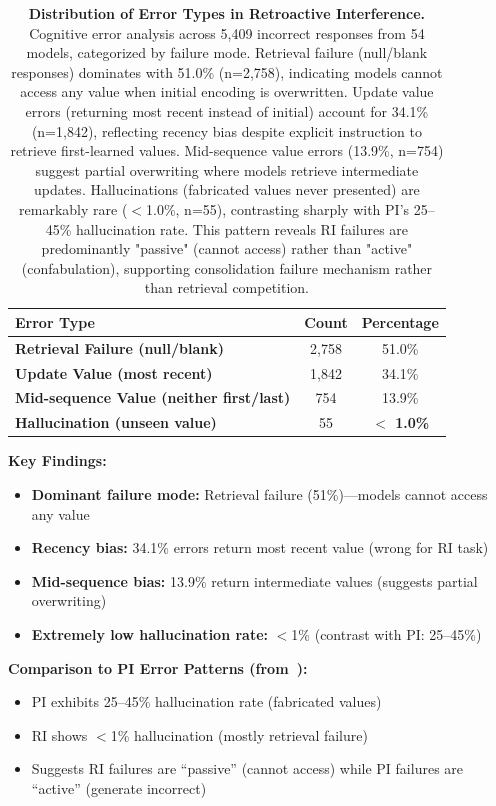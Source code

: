 \documentclass{article}
\begin{document}
\begin{table}[t]
\centering
\caption{\textbf{Distribution of Error Types in Retroactive Interference.}
Cognitive error analysis across 5,409 incorrect responses from 54 models, categorized by failure mode.
Retrieval failure (null/blank responses) dominates with 51.0\% (n=2,758), indicating models cannot access any value when initial encoding is overwritten.
Update value errors (returning most recent instead of initial) account for 34.1\% (n=1,842), reflecting recency bias despite explicit instruction to retrieve first-learned values.
Mid-sequence value errors (13.9\%, n=754) suggest partial overwriting where models retrieve intermediate updates.
Hallucinations (fabricated values never presented) are remarkably rare ($<$1.0\%, n=55), contrasting sharply with PI's 25--45\% hallucination rate.
This pattern reveals RI failures are predominantly "passive" (cannot access) rather than "active" (confabulation), supporting consolidation failure mechanism rather than retrieval competition.}
\begin{tabular}{lcc}
\toprule
Error Type & Count & Percentage \\
\midrule
\textbf{Retrieval Failure (null/blank)} & 2,758 & 51.0\% \\
\textbf{Update Value (most recent)} & 1,842 & 34.1\% \\
\textbf{Mid-sequence Value (neither first/last)} & 754 & 13.9\% \\
\textbf{Hallucination (unseen value)} & 55 & \textbf{$<$ 1.0\%} \\
\bottomrule
\end{tabular}
\end{table}

\textbf{Key Findings:}
\begin{itemize}[itemsep=2pt,topsep=3pt,parsep=0pt]
    \item \textbf{Dominant failure mode:} Retrieval failure (51\%)---models cannot access any value
    \item \textbf{Recency bias:} 34.1\% errors return most recent value (wrong for RI task)
    \item \textbf{Mid-sequence bias:} 13.9\% return intermediate values (suggests partial overwriting)
    \item \textbf{Extremely low hallucination rate:} $<$1\% (contrast with PI: 25--45\%)
\end{itemize}

\textbf{Comparison to PI Error Patterns (from~\citet{liu2024unable}):}
\begin{itemize}[itemsep=2pt,topsep=3pt,parsep=0pt]
    \item PI exhibits 25--45\% hallucination rate (fabricated values)
    \item RI shows $<$1\% hallucination (mostly retrieval failure)
    \item Suggests RI failures are ``passive'' (cannot access) while PI failures are ``active'' (generate incorrect)
\end{itemize}
\end{document}
